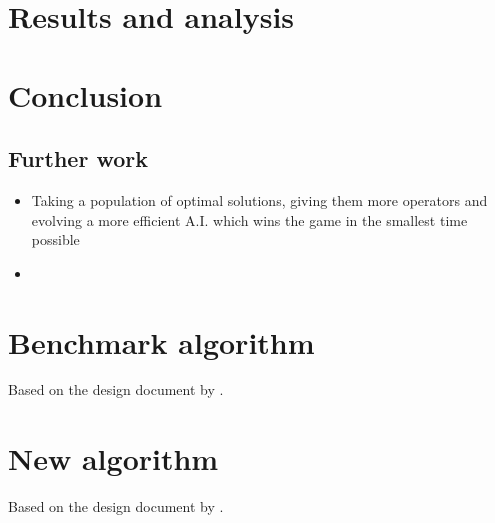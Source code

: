 \documentclass[british,10pt,a4paper]{article}
\begin{document}
\section{Results and analysis}
\section{Conclusion}
\subsection{Further work}
\begin{itemize}
	\item Taking a population of optimal solutions, giving them more operators and evolving a more efficient A.I. which wins the game in the smallest time possible
	\item 
\end{itemize}

\clearpage



\clearpage
\begin{appendices}

	\section{Benchmark algorithm}\label{app:approach1}
	Based on the design document by \citet{Ehlis2000-sz}. \newline
	
  	\clearpage	

	\section{New algorithm}\label{app:approach4}
	Based on the design document by \citet{Ehlis2000-sz}. \newline
	
  	\clearpage	

\end{appendices}
\clearpage
\end{document}
